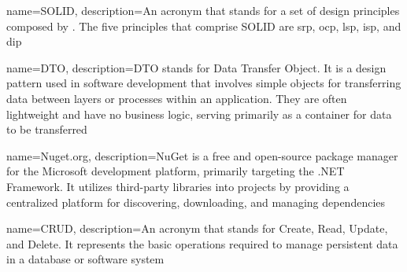 { name=SOLID, description={An acronym that stands for a set of design principles
    composed by . The five
    principles that comprise SOLID are \acrlong*{srp}, \acrlong*{ocp}, \acrlong*{lsp},
    \acrlong*{isp}, and \acrlong*{dip}}}

{ name=DTO, description={DTO stands for Data Transfer Object. It is a design pattern used
    in software development that involves simple objects for transferring data between
    layers or processes within an application. They are often lightweight and have no
    business logic, serving primarily as a container for data to be transferred}}

{ name=Nuget.org, description={NuGet is a free and open-source package manager for the
    Microsoft development platform, primarily targeting the .NET Framework. It utilizes
    third-party libraries into projects by providing a centralized platform for
    discovering, downloading, and managing dependencies}}

{ name=CRUD, description={An acronym that stands for Create, Read, Update, and Delete. It
represents the basic operations required to manage persistent data in a database or
software system}}